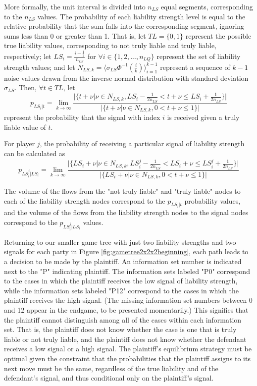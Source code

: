 \documentclass{article}
\begin{document}
More formally, the unit interval is divided into $n_{LS}$ equal segments, corresponding to the $n_{LS}$ values. The probability of each liability strength level is equal to the relative probability that the sum falls into the corresponding segment, ignoring sums less than 0 or greater than 1. That is, let $TL=\{0,1\}$ represent the possible true liability values, corresponding to not truly liable and truly liable, respectively; let $LS_i=\frac{i - \frac{1}{2} }{n_{LS} }$ for $\forall i \in \{1,2,...,n_{LQ}\}$ represent the set of liability strength values; and let $N_{LS,k}=\langle\sigma_{LS}\Phi^{-1}(\frac{i}{k}) \rangle_{i=1}^{k-1}$ represent a sequence of $k-1$ noise values drawn from the inverse normal  distribution with standard deviation $\sigma_{LS}$. Then, $\forall t\in TL$, let 
\begin{equation} 
p_{LS_i|t} = \lim_{k\to\infty} \frac{\lvert\{t+\nu |\nu \in N_{LS,k}, LS_i - \frac{1}{2n_{LS} }<t+\nu \leq LS_i + \frac{1}{2n_{LS} }\}\rvert}{\lvert\{t+\nu |\nu \in N_{LS,k}, 0<t+\nu \leq 1 \}\rvert}
\end{equation}
represent the probability that the signal with index $i$ is received given a truly liable value of $t$.

For player $j$, the probability of receiving a particular signal of liability strength can be calculated as
\begin{equation} 
p_{LS_i^j|LS_i} = \lim_{k\to\infty} \frac{\lvert\{LS_i+\nu |\nu \in N_{LS,k}, LS_i^j - \frac{1}{2n_{LS} }<LS_i+\nu \leq LS_i^j + \frac{1}{2n_{LS} }\}\rvert}{\lvert\{LS_i+\nu |\nu \in N_{LS,k}, 0<t+\nu \leq 1 \}\rvert}
\end{equation}

\noindent The volume of the flows from the "not truly liable" and "truly liable" nodes to each of the liability strength nodes correspond to the $p_{LS_i|t}$ probability values, and the volume of the flows from the liability strength nodes to the signal nodes correspond to the $p_{LS_i^j|LS_i}$ values. 

Returning to our smaller game tree with just two liability strengths and two signals for each party in Figure \ref{fig:gametree2x2x2beginning}, each path leads to a decision to be made by the plaintiff. An information set number is indicated next to the "P" indicating plaintiff. The information sets labeled "P0" correspond to the cases in which the plaintiff receives the low signal of liability strength, while the information sets labeled "P12" correspond to the cases in which the plaintiff receives the high signal. (The missing information set numbers between 0 and 12 appear in the endgame, to be presented momentarily.) This signifies that the plaintiff cannot distinguish among all of the cases within each information set. That is, the plaintiff does not know whether the case is one that is truly liable or not truly liable, and the plaintiff does not know whether the defendant receives a low signal or a high signal. The plaintiff's equilibrium strategy must be optimal given the constraint that the probabilities that the plaintiff assigns to its next move must be the same, regardless of the true liability and of the defendant's signal, and thus conditional only on the plaintiff's signal. 
\end{document}
